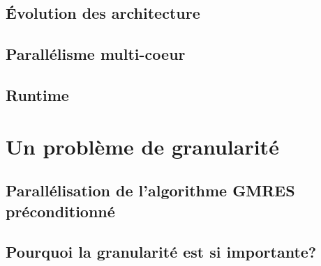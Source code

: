 \documentclass[oneside,12t]{classes/Thesis}
\begin{document}
\section{\'Evolution des architecture}





%



\section{Parallélisme multi-coeur}






\section{Runtime}





\chapter{Un problème de granularité}
\minitoc
\vspace{1cm}
\section{Parallélisation de l'algorithme GMRES préconditionné}



\section{Pourquoi la granularité est si importante?}


\end{document}
